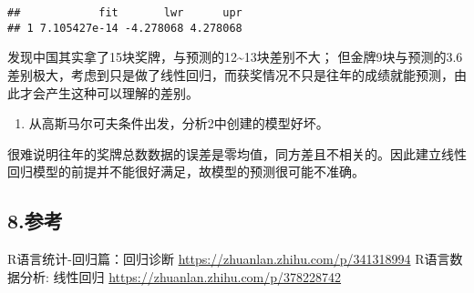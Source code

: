 \documentclass[
]{article}
\providecommand{\tightlist}{%
  \setlength{\itemsep}{0pt}\setlength{\parskip}{0pt}}
\begin{document}
\begin{verbatim}
##            fit       lwr      upr
## 1 7.105427e-14 -4.278068 4.278068
\end{verbatim}

发现中国其实拿了15块奖牌，与预测的12\textasciitilde13块差别不大；
但金牌9块与预测的3.6差别极大，考虑到只是做了线性回归，而获奖情况不只是往年的成绩就能预测，由此才会产生这种可以理解的差别。

\begin{enumerate}
\def\labelenumi{\arabic{enumi}.}
\setcounter{enumi}{4}
\tightlist
\item
  从高斯马尔可夫条件出发，分析2中创建的模型好坏。
\end{enumerate}

很难说明往年的奖牌总数数据的误差是零均值，同方差且不相关的。因此建立线性回归模型的前提并不能很好满足，故模型的预测很可能不准确。

\hypertarget{ux53c2ux8003}{%
\subsection{8.参考}\label{ux53c2ux8003}}

R语言统计-回归篇：回归诊断 \url{https://zhuanlan.zhihu.com/p/341318994}
R语言数据分析: 线性回归 \url{https://zhuanlan.zhihu.com/p/378228742}
\end{document}
